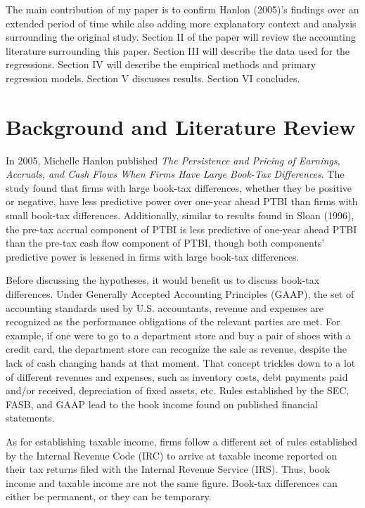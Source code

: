 \documentclass{article}
\begin{document}
The main contribution of my paper is to confirm Hanlon (2005)’s findings over an extended period of time while also adding more explanatory context and analysis surrounding the original study. Section II of the paper will review the accounting literature surrounding this paper. Section III will describe the data used for the regressions. Section IV will describe the empirical methods and primary regression models. Section V discusses results. Section VI concludes.

\section{Background and Literature Review}
In 2005, Michelle Hanlon published \textit{The Persistence and Pricing of Earnings, Accruals, and Cash Flows When Firms Have Large Book-Tax Differences}. The study found that firms with large book-tax differences, whether they be positive or negative, have less predictive power over one-year ahead PTBI than firms with small book-tax differences. Additionally, similar to results found in Sloan (1996), the pre-tax accrual component of PTBI is less predictive of one-year ahead PTBI than the pre-tax cash flow component of PTBI, though both components’ predictive power is lessened in firms with large book-tax differences.

Before discussing the hypotheses, it would benefit us to discuss book-tax differences. Under Generally Accepted Accounting Principles (GAAP), the set of accounting standards used by U.S. accountants, revenue and expenses are recognized as the performance obligations of the relevant parties are met. For example, if one were to go to a department store and buy a pair of shoes with a credit card, the department store can recognize the sale as revenue, despite the lack of cash changing hands at that moment. That concept trickles down to a lot of different revenues and expenses, such as inventory costs, debt payments paid and/or received, depreciation of fixed assets, etc. Rules established by the SEC, FASB, and GAAP lead to the book income found on published financial statements.

As for establishing taxable income, firms follow a different set of rules established by the Internal Revenue Code (IRC) to arrive at taxable income reported on their tax returns filed with the Internal Revenue Service (IRS). Thus, book income and taxable income are not the same figure. Book-tax differences can either be permanent, or they can be temporary. 
\end{document}
